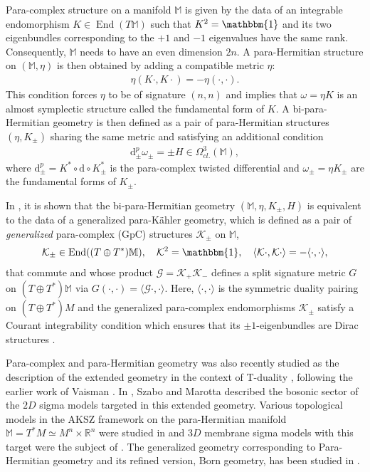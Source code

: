 \documentclass{article}
\newcommand{\TT}{{T\oplus T^*}}
\newcommand{\KK}{\mathcal{K}}
\newcommand{\GG}{\mathcal{G}}
\newcommand{\RR}{\mathbb{R}}
\newcommand{\id}{\mathbbm{1}}
\newcommand{\rd}{\mathrm{d}}
\newcommand{\la}{\langle}
\newcommand{\ra}{\rangle}
\newcommand{\Mb}{\mathbb{M}}
\theoremstyle{definition}
\theoremstyle{remark}
\DeclareMathOperator{\End}{End}
\begin{document}
Para-complex structure on a manifold $\Mb$ is given by the data of an integrable endomorphism $K \in \End(T\Mb)$ such that $K^2=\id$ and its two eigenbundles corresponding to the $+1$ and $-1$ eigenvalues have the same rank. Consequently, $\Mb$ needs to have an even dimension $2n$. A para-Hermitian structure on $(\Mb,\eta)$ is then obtained by adding a compatible metric $\eta$:
\begin{align*}
\eta(K\cdot,K\cdot)=-\eta(\cdot,\cdot).
\end{align*}
This condition forces $\eta$ to be of signature $(n,n)$ and implies that $\omega=\eta K$ is an almost symplectic structure called the fundamental form of $K$. A bi-para-Hermitian geometry is then defined as a pair of para-Hermitian structures $(\eta,K_\pm)$ sharing the same metric and satisfying an additional condition
\begin{align}
\rd^p_\pm\omega_\pm=\pm H \in \Omega^3_{cl.}(\Mb),
\end{align}
where $\rd^p_\pm=K^*\circ \rd\circ K_\pm^*$ is the para-complex twisted differential and $\omega_\pm=\eta K_\pm$ are the fundamental forms of $K_\pm$.

In \cite{Hu:2019zro}, it is shown that the bi-para-Hermitian geometry $(\Mb,\eta,K_\pm,H)$ is equivalent to the data of a generalized para-K\"ahler geometry, which is defined as a pair of {\it generalized} para-complex (GpC) structures $\KK_\pm$ \cite{wade2004dirac,Zabzine:2006uz,Hu:2019zro} on $\Mb$,
\begin{align*}
\KK_\pm \in \End((\TT)\Mb), \quad \KK^2=\id, \quad \la \KK\cdot,\KK\cdot\ra=-\la\cdot,\cdot \ra,
\end{align*}
that commute and whose product $\GG=\KK_+\KK_-$ defines a split signature metric $G$ on $(\TT)\Mb$ via $G(\cdot,\cdot)=\la \GG\cdot,\cdot\ra$. Here, $\la\cdot,\cdot \ra$ is the symmetric duality pairing on $(\TT)M$ and the generalized para-complex endomorphisms $\KK_\pm$ satisfy a Courant integrability condition which ensures that its $\pm 1$-eigenbundles are Dirac structures \cite{courant1990dirac}.


Para-complex and para-Hermitian geometry was also recently studied as the description of the extended geometry in the context of T-duality \cite{freidel2017generalised,Freidel:2018tkj,Svoboda:2018rci,Marotta:2018myj}, following the earlier work of Vaisman \cite{vaisman2012geometry,vaisman2013towards}. In \cite{Marotta:2019eqc}, Szabo and Marotta described the bosonic sector of the $2D$ sigma models targeted in this extended geometry. Various topological models in the AKSZ framework on the para-Hermitian manifold $\Mb=T^*M\simeq M^n\times \RR^n$ were studied in \cite{Kokenyesi:2018xgj} and $3D$ membrane sigma models with this target were the subject of \cite{Chatzistavrakidis:2018ztm}. The generalized geometry corresponding to Para-Hermitian geometry and its refined version, Born geometry, has been studied in \cite{Hu:2019zro}.
\end{document}
